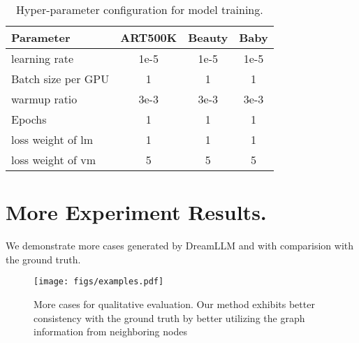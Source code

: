 \begin{table}[h!]
\centering
\caption{Hyper-parameter configuration for model training.}
\begin{tabular}{|l|c|c|c|}
\hline
\textbf{Parameter}             & \textbf{ART500K} & \textbf{Beauty} & \textbf{Baby} \\ \hline
learning rate                      & 1e-5            & 1e-5           & 1e-5              \\ \hline
Batch size per GPU             & 1               & 1              & 1                 \\ \hline
warmup ratio          & 3e-3                & 3e-3              & 3e-3                  \\ \hline
Epochs                         & 1               & 1              & 1                 \\ \hline
loss weight of lm                     & 1              & 1             & 1                \\ \hline
loss weight of vm                  & 5             & 5            & 5               \\ \hline
\end{tabular}
\label{tab:hyperparams}
\end{table}

\section{More Experiment Results.}
We demonstrate more cases generated by DreamLLM and \Ours with comparision with the ground truth.

\begin{figure*}
    \centering
    \texttt{[image: figs/examples.pdf]}
    \caption{More cases for qualitative evaluation. Our method exhibits better consistency with the ground truth by better utilizing the graph information
from neighboring nodes}
    \label{fig:enter-label}
\end{figure*}


